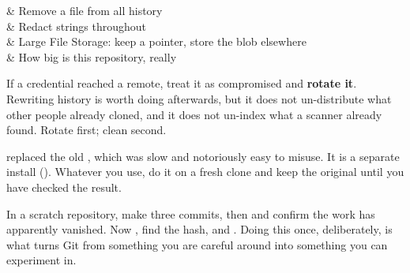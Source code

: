 \begin{keys}[0.36]
	 & Remove a file from all history \\
	 & Redact strings throughout       \\
	      & Large File Storage: keep a pointer, store the blob elsewhere \\
	      & How big is this repository, really            \\
\end{keys}

\begin{moral}
	If a credential reached a remote, treat it as compromised and \textbf{rotate
		it}. Rewriting history is worth doing afterwards, but it does not
	un-distribute what other people already cloned, and it does not un-index what a
	scanner already found. Rotate first; clean second.
\end{moral}

\begin{note}
	 replaced the old , which was slow and
	notoriously easy to misuse. It is a separate install
	(). Whatever you use, do it on a fresh clone
	and keep the original until you have checked the result.
\end{note}

\begin{tryit}
	In a scratch repository, make three commits, then 
	and confirm the work has apparently vanished. Now , find the
	hash, and . Doing this once, deliberately, is what
	turns Git from something you are careful around into something you can
	experiment in.
\end{tryit}
